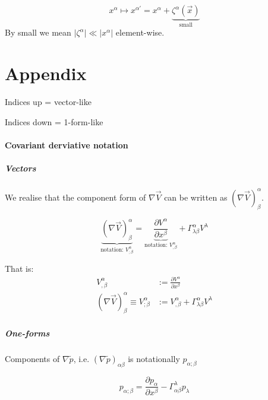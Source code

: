 \documentclass[a4paper]{article} %
\renewcommand{\tilde}{\widetilde}
\begin{document}
\begin{equation}
x^{\alpha} \mapsto x^{\alpha'} = x^{\alpha} + \underbrace{\zeta^{\alpha}(\vec{x})}_{\text{small}}
\end{equation}
By small we mean $\lvert \zeta^{\alpha} \rvert \ll \lvert x^{\alpha} \rvert$ element-wise.


\pagebreak
\part{Appendix}


Indices up = vector-like

Indices down = 1-form-like

\subsection{Covariant derviative notation}
\subsubsection{Vectors}
We realise that the component form of $\nabla \vec{V}$ can be written as $(\nabla \vec{V})^{\alpha}_{\beta}$.

\begin{equation}
\underbrace{(\nabla \vec{V})^{\alpha}_{\beta}}_{\text{notation: }V^{\alpha}_{;\beta}}=
\underbrace{\frac{\partial V^{\alpha}}{\partial x^{\beta}}}_{\text{notation: }V^{\alpha}_{,\beta}}
+\Gamma^{\alpha}_{\lambda\beta}V^{\lambda}
\end{equation}

That is:
\begin{align}
V^{\alpha}_{,\beta}&:=\frac{\partial V^{\alpha}}{\partial x^{\beta}}\\
(\nabla \vec{V})^{\alpha}_{\beta}\equiv V^{\alpha}_{;\beta}&:=V^{\alpha}_{,\beta}+\Gamma^{\alpha}_{\lambda\beta}V^{\lambda}
\end{align}

\subsubsection{One-forms}
Components of $\nabla\tilde{p}$, i.e. $(\nabla\tilde{p})_{\alpha\beta}$ is notationally $p_{\alpha;\beta}$

\begin{equation}
p_{\alpha;\beta}=\frac{\partial p_{\alpha}}{\partial x^{\beta}}-\Gamma^{\lambda}_{\alpha\beta} p_{\lambda}
\end{equation}
\end{document}
